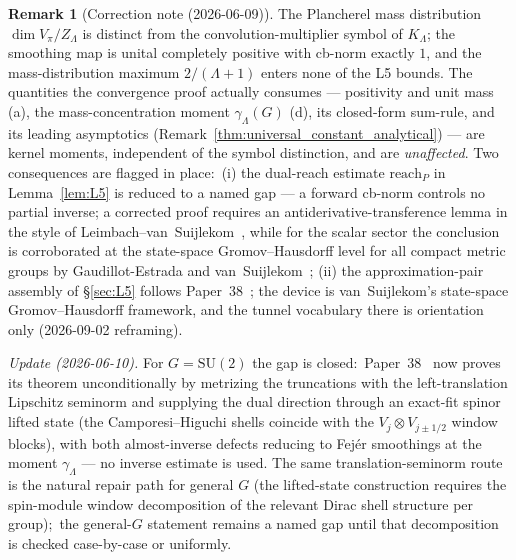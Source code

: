 \documentclass[11pt,a4paper]{article}
\theoremstyle{plain}
\theoremstyle{definition}
\newtheorem{remark}[theorem]{Remark}
\newcommand{\Lammax}{\Lambda}
\newcommand{\SU}{\mathrm{SU}}
\newcommand{\KS}{K}
\begin{document}
\begin{remark}[Correction note (2026-06-09)]\label{rem:correction_L2}
The Plancherel mass distribution $\dim V_\pi / Z_\Lammax$ is distinct
from the convolution-multiplier symbol of $\KS_\Lammax$; the smoothing
map is unital completely positive with cb-norm exactly $1$, and the
mass-distribution maximum $2/(\Lammax+1)$ enters none of the L5
bounds. The quantities the convergence proof actually consumes ---
positivity and unit mass (a), the mass-concentration moment
$\gamma_\Lammax(G)$ (d), its closed-form sum-rule, and its leading
asymptotics (Remark~\ref{thm:universal_constant_analytical}) ---
are kernel moments, independent of the symbol distinction, and are
\emph{unaffected}. Two consequences are flagged in place:\ (i) the
dual-reach estimate $\mathrm{reach}_P$ in Lemma~\ref{lem:L5} is
reduced to a named gap --- a forward cb-norm controls no partial
inverse; a corrected proof requires an antiderivative-transference
lemma in the style of Leimbach--van~Suijlekom~\cite{leimbach_vs2024},
while for the scalar sector the conclusion is corroborated at the
state-space Gromov--Hausdorff level for all compact metric groups by
Gaudillot-Estrada and van~Suijlekom~\cite{gaudillot_estrada_vs2025};
(ii) the approximation-pair assembly of \S\ref{sec:L5} follows
Paper~38~\cite{paper38}; the device is van~Suijlekom's state-space
Gromov--Hausdorff framework, and the tunnel vocabulary there is
orientation only (2026-09-02 reframing).

\emph{Update (2026-06-10).} For $G = \SU(2)$ the gap is closed:\
Paper~38~\cite{paper38} now proves its theorem unconditionally by
metrizing the truncations with the left-translation Lipschitz
seminorm and supplying the dual direction through an exact-fit spinor
lifted state (the Camporesi--Higuchi shells coincide with the
$V_j \otimes V_{j \pm 1/2}$ window blocks), with both almost-inverse
defects reducing to Fej\'er smoothings at the moment
$\gamma_{\Lammax}$ --- no inverse estimate is used. The same
translation-seminorm route is the natural repair path for general
$G$ (the lifted-state construction requires the spin-module window
decomposition of the relevant Dirac shell structure per group);\ the
general-$G$ statement remains a named gap until that decomposition
is checked case-by-case or uniformly.
\end{remark}
\end{document}
